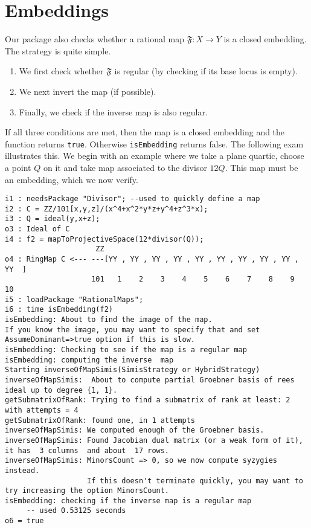 \documentclass[11pt]{amsart}
\numberwithin{equation}{theorem}
\renewcommand{\:}{\colon}
\theoremstyle{theorem}
\begin{document}
{\color{black}\normalsize
\section{Embeddings}

Our package also checks whether a rational map $\mathfrak{F} : X \to Y$ is a closed embedding.  The strategy is quite simple.
\begin{enumerate}
\item  We first check whether $\mathfrak{F}$ is regular (by checking if its base locus is empty).
\item  We next invert the map (if possible).
\item  Finally, we check if the inverse map is also regular.
\end{enumerate}
If all three conditions are met, then the map is a closed embedding and the function returns {\tt true}.  Otherwise {\tt isEmbedding} returns false.
The following exam illustrates this.  We begin with an example where we take a plane quartic, choose a point $Q$ on it and take map associated to 
the divisor $12 Q$.  This map must be an embedding, which we now verify.
}
{\scriptsize
\color{blue}\begin{verbatim}
i1 : needsPackage "Divisor"; --used to quickly define a map
i2 : C = ZZ/101[x,y,z]/(x^4+x^2*y*z+y^4+z^3*x);
i3 : Q = ideal(y,x+z);
o3 : Ideal of C
i4 : f2 = mapToProjectiveSpace(12*divisor(Q));
                     ZZ
o4 : RingMap C <--- ---[YY , YY , YY , YY , YY , YY , YY , YY , YY , YY  ]
                    101   1    2    3    4    5    6    7    8    9    10
i5 : loadPackage "RationalMaps";
i6 : time isEmbedding(f2)
isEmbedding: About to find the image of the map.
If you know the image, you may want to specify that and set AssumeDominant=>true option if this is slow.
isEmbedding: Checking to see if the map is a regular map
isEmbedding: computing the inverse  map
Starting inverseOfMapSimis(SimisStrategy or HybridStrategy)
inverseOfMapSimis:  About to compute partial Groebner basis of rees ideal up to degree {1, 1}.
getSubmatrixOfRank: Trying to find a submatrix of rank at least: 2 with attempts = 4
getSubmatrixOfRank: found one, in 1 attempts
inverseOfMapSimis: We computed enough of the Groebner basis.
inverseOfMapSimis: Found Jacobian dual matrix (or a weak form of it), it has  3 columns  and about  17 rows.
inverseOfMapSimis: MinorsCount => 0, so we now compute syzygies instead.
                   If this doesn't terminate quickly, you may want to try increasing the option MinorsCount.
isEmbedding: checking if the inverse map is a regular map
     -- used 0.53125 seconds
o6 = true
\end{verbatim}
}
\end{document}
